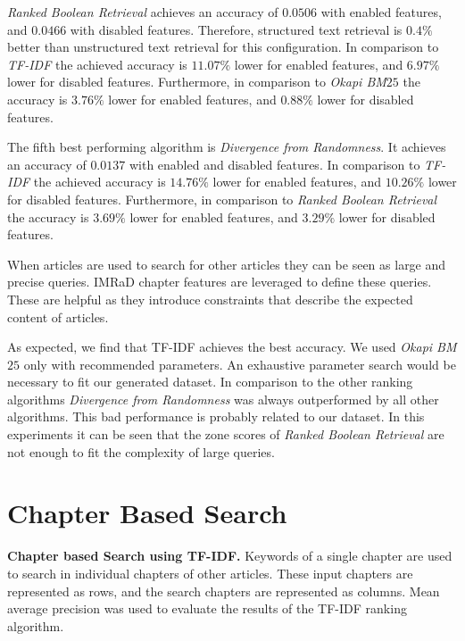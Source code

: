 \textit{Ranked Boolean Retrieval} achieves an accuracy of $0.0506$ with enabled features, and $0.0466$ with disabled features. Therefore, structured text retrieval is $0.4 \%$ better than unstructured text retrieval for this configuration. In comparison to \textit{TF-IDF} the achieved accuracy is $11.07 \%$ lower for enabled features, and $6.97 \%$ lower for disabled features. Furthermore, in comparison to \textit{Okapi BM$25$} the accuracy is $3.76 \%$ lower for enabled features, and $0.88 \%$ lower for disabled features.

The fifth best performing algorithm is \textit{Divergence from Randomness}. It achieves an accuracy of $0.0137$ with enabled and disabled features. In comparison to \textit{TF-IDF} the achieved accuracy is $14.76 \%$ lower for enabled features, and $10.26 \%$ lower for disabled features. Furthermore, in comparison to \textit{Ranked Boolean Retrieval} the accuracy is $3.69 \%$ lower for enabled features, and $3.29 \%$ lower for disabled features.

When articles are used to search for other articles they can be seen as large and precise queries. IMRaD chapter features are leveraged to define these queries. These are helpful as they introduce constraints that describe the expected content of articles.

As expected, we find that TF-IDF achieves the best accuracy. We used \textit{Okapi BM$25$} only with recommended parameters. An exhaustive parameter search would be necessary to fit our generated dataset. In comparison to the other ranking algorithms \textit{Divergence from Randomness} was always outperformed by all other algorithms. This bad performance is probably related to our dataset. In this experiments it can be seen that the zone scores of \textit{Ranked Boolean Retrieval} are not enough to fit the complexity of large queries. 


\section{Chapter Based Search}

\begin{table}[b!]
\vrule{}\vrule
  \caption[Chapter based Search using TF-IDF]{\textbf{Chapter based Search using TF-IDF.} Keywords of a single chapter are used to search in individual chapters of other articles. These input chapters are represented as rows, and the search chapters are represented as columns. Mean average precision was used to evaluate the results of the TF-IDF ranking algorithm.}
  \label{tbl:chapter_based_tfidf}
\end{table}

